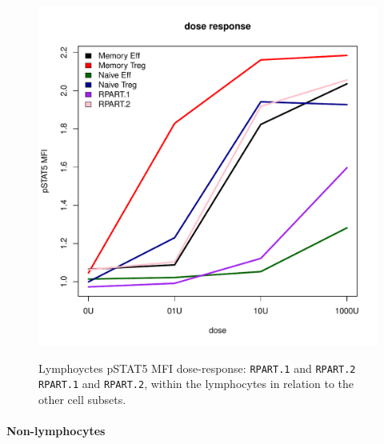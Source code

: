 \begin{figure}
%
\begin{minipage}{.5\textwidth}
  \includegraphics[scale=.4]{figures/rpart-lymphocytes-dose-response}
\end{minipage}
\begin{minipage}{.3\textwidth}
{  Lymphoyctes pSTAT5 MFI dose-response: \texttt{RPART.1} and \texttt{RPART.2} }
{
    \texttt{RPART.1} and \texttt{RPART.2}, within the lymphocytes in relation to the other cell subsets.
}
\end{minipage}
\end{figure}

\clearpage


\paragraph{Non-lymphocytes}

